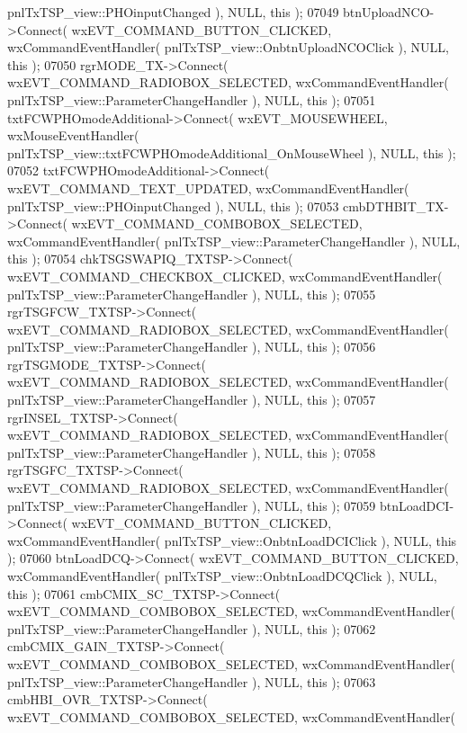 \begin{DoxyCode}
      pnlTxTSP_view::PHOinputChanged ), NULL, \textcolor{keyword}{this} );
07049     btnUploadNCO->Connect( wxEVT\_COMMAND\_BUTTON\_CLICKED, wxCommandEventHandler( 
      pnlTxTSP_view::OnbtnUploadNCOClick ), NULL, \textcolor{keyword}{this} );
07050     rgrMODE_TX->Connect( wxEVT\_COMMAND\_RADIOBOX\_SELECTED, wxCommandEventHandler( 
      pnlTxTSP_view::ParameterChangeHandler ), NULL, \textcolor{keyword}{this} );
07051     txtFCWPHOmodeAdditional->Connect( wxEVT\_MOUSEWHEEL, wxMouseEventHandler( 
      pnlTxTSP_view::txtFCWPHOmodeAdditional_OnMouseWheel ), NULL, \textcolor{keyword}{this} );
07052     txtFCWPHOmodeAdditional->Connect( wxEVT\_COMMAND\_TEXT\_UPDATED, wxCommandEventHandler( 
      pnlTxTSP_view::PHOinputChanged ), NULL, \textcolor{keyword}{this} );
07053     cmbDTHBIT_TX->Connect( wxEVT\_COMMAND\_COMBOBOX\_SELECTED, wxCommandEventHandler( 
      pnlTxTSP_view::ParameterChangeHandler ), NULL, \textcolor{keyword}{this} );
07054     chkTSGSWAPIQ_TXTSP->Connect( wxEVT\_COMMAND\_CHECKBOX\_CLICKED, wxCommandEventHandler( 
      pnlTxTSP_view::ParameterChangeHandler ), NULL, \textcolor{keyword}{this} );
07055     rgrTSGFCW_TXTSP->Connect( wxEVT\_COMMAND\_RADIOBOX\_SELECTED, wxCommandEventHandler( 
      pnlTxTSP_view::ParameterChangeHandler ), NULL, \textcolor{keyword}{this} );
07056     rgrTSGMODE_TXTSP->Connect( wxEVT\_COMMAND\_RADIOBOX\_SELECTED, wxCommandEventHandler( 
      pnlTxTSP_view::ParameterChangeHandler ), NULL, \textcolor{keyword}{this} );
07057     rgrINSEL_TXTSP->Connect( wxEVT\_COMMAND\_RADIOBOX\_SELECTED, wxCommandEventHandler( 
      pnlTxTSP_view::ParameterChangeHandler ), NULL, \textcolor{keyword}{this} );
07058     rgrTSGFC_TXTSP->Connect( wxEVT\_COMMAND\_RADIOBOX\_SELECTED, wxCommandEventHandler( 
      pnlTxTSP_view::ParameterChangeHandler ), NULL, \textcolor{keyword}{this} );
07059     btnLoadDCI->Connect( wxEVT\_COMMAND\_BUTTON\_CLICKED, wxCommandEventHandler( 
      pnlTxTSP_view::OnbtnLoadDCIClick ), NULL, \textcolor{keyword}{this} );
07060     btnLoadDCQ->Connect( wxEVT\_COMMAND\_BUTTON\_CLICKED, wxCommandEventHandler( 
      pnlTxTSP_view::OnbtnLoadDCQClick ), NULL, \textcolor{keyword}{this} );
07061     cmbCMIX_SC_TXTSP->Connect( wxEVT\_COMMAND\_COMBOBOX\_SELECTED, wxCommandEventHandler( 
      pnlTxTSP_view::ParameterChangeHandler ), NULL, \textcolor{keyword}{this} );
07062     cmbCMIX_GAIN_TXTSP->Connect( wxEVT\_COMMAND\_COMBOBOX\_SELECTED, wxCommandEventHandler( 
      pnlTxTSP_view::ParameterChangeHandler ), NULL, \textcolor{keyword}{this} );
07063     cmbHBI_OVR_TXTSP->Connect( wxEVT\_COMMAND\_COMBOBOX\_SELECTED, wxCommandEventHandler( 

\end{DoxyCode}
